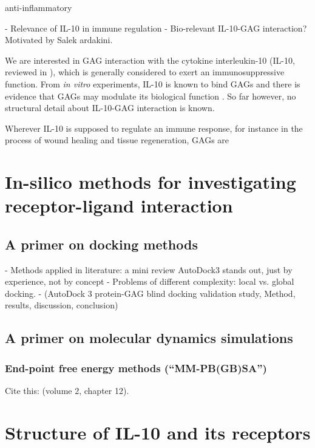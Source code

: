  anti-inflammatory

- Relevance of IL-10 in immune regulation
- Bio-relevant IL-10-GAG interaction? Motivated by Salek ardakini.

We are interested in GAG interaction with the cytokine interleukin-10 (IL-10,
reviewed in \cite{moore_2001}), which is generally considered to exert an
immunosuppressive function. From \textit{in vitro} experiments, IL-10 is known
to bind GAGs and there is evidence that GAGs may modulate its biological
function \cite{salek_ardakani_2000}. So far however, no structural detail about
IL-10-GAG interaction is known.


Wherever IL-10 is supposed to
regulate an immune response, for instance in the process of wound healing and
tissue regeneration, GAGs are


\section{In-silico methods for investigating receptor-ligand interaction}

\subsection{A primer on docking methods}


    - Methods applied in literature: a mini review
        AutoDock3 stands out, just by experience, not by concept
    - Problems of different complexity: local vs. global docking.
    - (AutoDock 3 protein-GAG blind docking validation study,
        Method, results, discussion, conclusion)

\lipsum[1-5]

\subsection{A primer on molecular dynamics simulations}

\lipsum[1-5]

\subsubsection{End-point free energy methods (\enquote{MM-PB(GB)SA})}
\label{methods:mmpbsa_mmgbsa}


Cite this: \cite{schlick_innovationsdynamics_2012} (volume 2, chapter 12).

\lipsum[1-5]

\section{Structure of IL-10 and its receptors}

